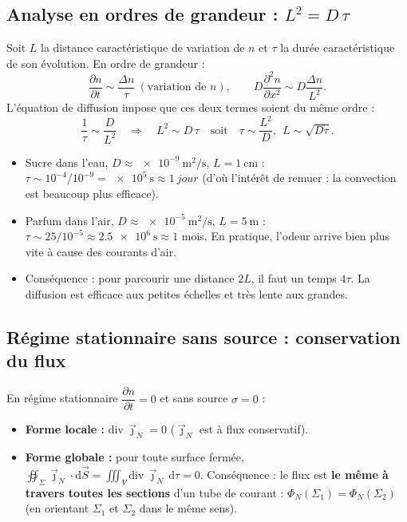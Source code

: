 \documentclass[11pt,a4paper]{article}
\newcommand{\jn}{\vec{\jmath}_N}
\renewcommand{\div}{\mathrm{div}\,}
\newcommand{\dd}{\mathrm{d}}
\newcommand{\pd}[2]{\dfrac{\partial #1}{\partial #2}}
\newcommand{\pdd}[2]{\dfrac{\partial^2 #1}{\partial #2^2}}
\begin{document}
\subsection{Analyse en ordres de grandeur : $L^2 = D\,\tau$}

\begin{demo}[title={Démonstration : relation entre échelles spatiale et temporelle}]
Soit $L$ la distance caractéristique de variation de $n$ et $\tau$ la durée
caractéristique de son évolution. En ordre de grandeur :
\[ \pd{n}{t}\sim\dfrac{\Delta n}{\tau}\ (\text{variation de } n),\qquad
   D\pdd{n}{x}\sim D\dfrac{\Delta n}{L^2}. \]
L'équation de diffusion impose que ces deux termes soient du même ordre :
\[ \dfrac{1}{\tau}\sim\dfrac{D}{L^2}\quad\Longrightarrow\quad
   \boxed{L^2\sim D\,\tau}\quad\text{soit}\quad \tau\sim\dfrac{L^2}{D},\ \ L\sim\sqrt{D\tau}. \]
\end{demo}

\begin{exemple}
\begin{itemize}[leftmargin=1.5em]
  \item Sucre dans l'eau, $D\approx\SI{e-9}{\square\metre\per\second}$, $L=\SI{1}{\centi\metre}$ :
        $\tau\sim 10^{-4}/10^{-9}=\SI{e5}{\second}\approx\SI{1}{jour}$ (d'où l'intérêt de
        remuer : la convection est beaucoup plus efficace).
  \item Parfum dans l'air, $D\approx\SI{e-5}{\square\metre\per\second}$, $L=\SI{5}{\metre}$ :
        $\tau\sim 25/10^{-5}\approx\SI{2.5e6}{\second}\approx 1$ mois. En pratique,
        l'odeur arrive bien plus vite à cause des courants d'air.
  \item Conséquence : pour parcourir une distance $2L$, il faut un temps $4\tau$. La diffusion
        est efficace aux petites échelles et très lente aux grandes.
\end{itemize}
\end{exemple}

\subsection{Régime stationnaire sans source : conservation du flux}

\begin{demo}[title={Démonstration : conservation du flux (formes locale et globale)}]
En régime stationnaire $\pd{n}{t}=0$ et sans source $\sigma=0$ :
\begin{itemize}[leftmargin=1.5em]
  \item \textbf{Forme locale :} $\boxed{\div\jn=0}$ ($\jn$ est à flux conservatif).
  \item \textbf{Forme globale :} pour toute surface fermée, $\oiint_\Sigma\jn\cdot\dd\vec S=
        \iiint_V\div\jn\,\dd\tau=0$. Conséquence : le flux est \textbf{le même à travers
        toutes les sections} d'un tube de courant : $\Phi_N(\Sigma_1)=\Phi_N(\Sigma_2)$
        (en orientant $\Sigma_1$ et $\Sigma_2$ dans le même sens).
\end{itemize}
\end{demo}
\end{document}
